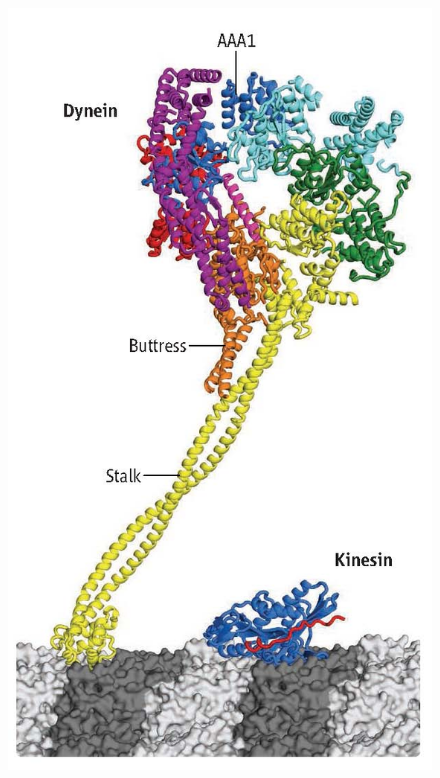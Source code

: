 \documentclass[
11pt, %
english, %
singlespacing, %
headsepline, %
chapterinoneline, %
]{MastersDoctoralThesis} %
\begin{document}
\begin{figure}[H]
  \centering
  \begin{minipage}{0.3\textwidth}
    \includegraphics[width=\textwidth,keepaspectratio]{../../figures/kinesin_vs_dynein}
  \end{minipage}
  \begin{minipage}{0.65\textwidth}

\end{minipage}
\end{figure}
\end{document}
